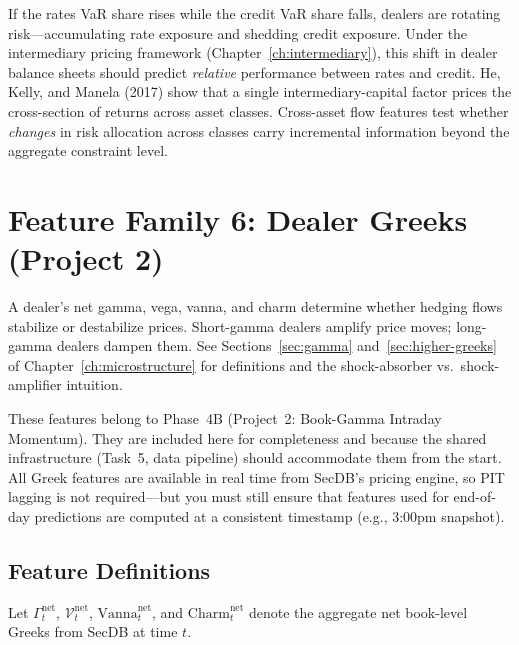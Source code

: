 \begin{keyidea}
If the rates VaR share rises while the credit VaR share falls,
dealers are rotating risk---accumulating rate exposure and shedding
credit exposure.  Under the intermediary pricing framework
(Chapter~\ref{ch:intermediary}), this shift in dealer balance sheets
should predict \emph{relative} performance between rates and credit.
He, Kelly, and Manela (2017) show that a single intermediary-capital
factor prices the cross-section of returns across asset classes.
Cross-asset flow features test whether \emph{changes} in risk
allocation across classes carry incremental information beyond
the aggregate constraint level.
\end{keyidea}


\section{Feature Family 6: Dealer Greeks (Project 2)}
\label{sec:feat-greeks}

\begin{prereq}
A dealer's net gamma, vega, vanna, and charm determine whether hedging
flows stabilize or destabilize prices.  Short-gamma dealers amplify
price moves; long-gamma dealers dampen them.  See
Sections~\ref{sec:gamma} and~\ref{sec:higher-greeks} of
Chapter~\ref{ch:microstructure} for definitions and the
shock-absorber vs.\ shock-amplifier intuition.
\end{prereq}

These features belong to Phase~4B (Project~2: Book-Gamma Intraday
Momentum).  They are included here for completeness and because the
shared infrastructure (Task~5, data pipeline) should accommodate them
from the start.  All Greek features are available in real time from
SecDB's pricing engine, so PIT lagging is not required---but you must
still ensure that features used for end-of-day predictions are computed
at a consistent timestamp (e.g., 3:00pm snapshot).

\subsection{Feature Definitions}

Let $\Gamma^{\text{net}}_t$, $\mathcal{V}^{\text{net}}_t$,
$\text{Vanna}^{\text{net}}_t$, and $\text{Charm}^{\text{net}}_t$ denote
the aggregate net book-level Greeks from SecDB at time $t$.

